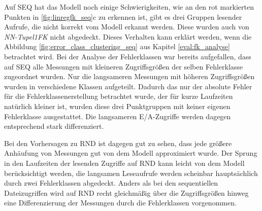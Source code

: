 \documentclass[
	12pt,
	a4paper,
	BCOR10mm,
	DIV14,
	listof=totoc,
	bibliography=totoc,
	headsepline
]{scrreprt}
\begin{document}
Auf SEQ hat das Modell noch einige Schwierigkeiten, wie an den rot markierten Punkten in \ref{fig:linregfk_seq}c zu erkennen ist, gibt es drei Gruppen lesender Aufrufe, die nicht korrekt vom Modell erkannt werden. Diese wurden auch von \textit{NN-Tupel1FK} nicht abgedeckt.
Dieses Verhalten kann erklärt werden, wenn die Abbildung \ref{fig:error_class_clustering_seq} aus Kapitel \ref{eval:fk_analyse} betrachtet wird.
Bei der Analyse der Fehlerklassen war bereits aufgefallen, dass auf SEQ alle Messungen mit kleineren Zugriffsgrößen der selben Fehlerklasse zugeordnet wurden.
Nur die langsameren Messungen mit höheren Zugriffsgrößen wurden in verschiedene Klassen aufgeteilt.
Dadurch das nur der absolute Fehler für die Fehlerklassenerstellung betrachtet wurde, der für kurze Laufzeiten natürlich kleiner ist, wurden diese drei Punktgruppen mit keiner eigenen Fehlerklasse ausgestattet.
Die langsameren E/A-Zugriffe werden dagegen entsprechend stark differenziert.\medskip

Bei den Vorhersagen zu RND ist dagegen gut zu sehen, dass jede größere Anhäufung von Messungen gut von dem Modell approximiert wurde.
Der Sprung in den Laufzeiten der lesenden Zugriffe auf RND kann leicht von dem Modell berücksichtigt werden, die langsamen Leseaufrufe werden scheinbar hauptsächlich durch zwei Fehlerklassen abgedeckt.
Anders als bei den sequentiellen Dateizugriffen wird auf RND recht gleichmäßig über die Zugriffsgrößen hinweg eine Differenzierung der Messungen durch die Fehlerklassen vorgenommen.
\end{document}
